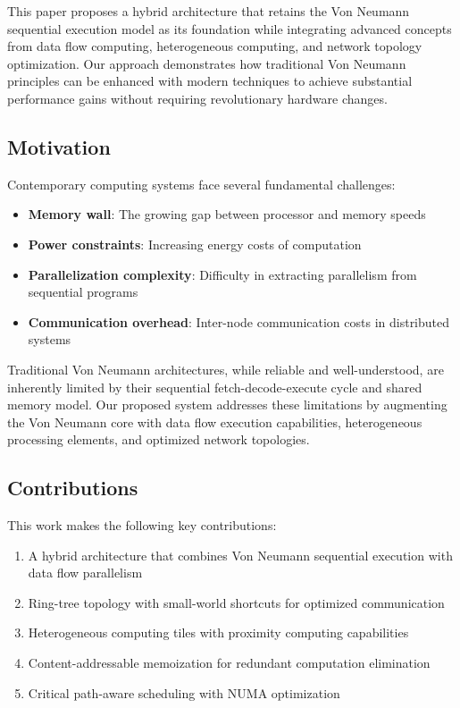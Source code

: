 \documentclass[11pt,a4paper]{article}
\begin{document}
This paper proposes a hybrid architecture that retains the Von Neumann sequential execution model as its foundation while integrating advanced concepts from data flow computing, heterogeneous computing, and network topology optimization. Our approach demonstrates how traditional Von Neumann principles can be enhanced with modern techniques to achieve substantial performance gains without requiring revolutionary hardware changes.

\subsection{Motivation}

Contemporary computing systems face several fundamental challenges:
\begin{itemize}
\item \textbf{Memory wall}: The growing gap between processor and memory speeds
\item \textbf{Power constraints}: Increasing energy costs of computation
\item \textbf{Parallelization complexity}: Difficulty in extracting parallelism from sequential programs
\item \textbf{Communication overhead}: Inter-node communication costs in distributed systems
\end{itemize}

Traditional Von Neumann architectures, while reliable and well-understood, are inherently limited by their sequential fetch-decode-execute cycle and shared memory model. Our proposed system addresses these limitations by augmenting the Von Neumann core with data flow execution capabilities, heterogeneous processing elements, and optimized network topologies.

\subsection{Contributions}

This work makes the following key contributions:
\begin{enumerate}
\item A hybrid architecture that combines Von Neumann sequential execution with data flow parallelism
\item Ring-tree topology with small-world shortcuts for optimized communication
\item Heterogeneous computing tiles with proximity computing capabilities
\item Content-addressable memoization for redundant computation elimination
\item Critical path-aware scheduling with NUMA optimization
\end{enumerate}
\end{document}
